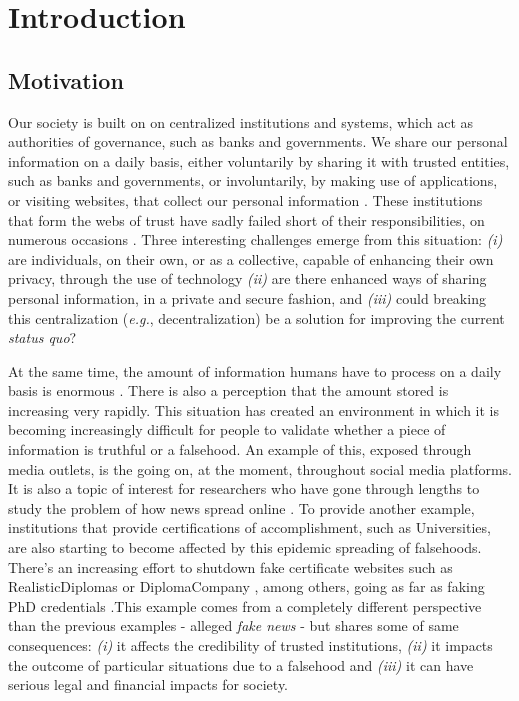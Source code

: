 \chapter{Introduction}
\label{chap:intro}

\section{Motivation}
\label{sec:intro-motivation}

Our society is built on on centralized institutions and systems, which act as authorities of governance, such as banks and governments. We share our personal information on a daily basis, either voluntarily by sharing it with trusted entities, such as banks and governments, or involuntarily, by making use of applications, or visiting websites, that collect our personal information \cite{debatin_facebook_2009, choi_embarrassing_2015, shilton_four_nodate}. These institutions that form the webs of trust have sadly failed short of their responsibilities, on numerous occasions \cite{gibbs_facebook_2014, ivashina_bank_2010, marthews_government_2017}. Three interesting challenges emerge from this situation: \emph{(i)} are individuals, on their own, or as a collective, capable of enhancing their own privacy, through the use of technology \emph{(ii)} are there enhanced ways of sharing personal information, in a private and secure fashion, and \emph{(iii)} could breaking this centralization (\textit{e.g.}, decentralization) be a solution for improving the current \textit{status quo}?

At the same time, the amount of information humans have to process on a daily basis is enormous \cite{hilbert_worlds_2011, lee_information_2016}. There is also a perception that the amount stored is increasing very rapidly. This situation has created an environment in which it is becoming increasingly difficult for people to validate whether a piece of information is truthful or a falsehood. An example of this, exposed through media outlets, is the  going on, at the moment, throughout social media platforms. It is also a topic of interest for researchers who have gone through lengths to study the problem of how news spread online \cite{vosoughi_spread_2018}. To provide another example, institutions that provide certifications of accomplishment, such as Universities, are also starting to become affected by this epidemic spreading of falsehoods. There’s an increasing effort to shutdown fake certificate websites \cite{camilla_telegraph} such as RealisticDiplomas \cite{RealisticDiplomas} or DiplomaCompany \cite{DiplomaCompany}, among others, going as far as faking PhD credentials \cite{doctoroff_tang_2010}.This example comes from a completely different perspective than the previous examples - alleged \textit{fake news} - but shares some of same consequences: \emph{(i)} it affects the credibility of trusted institutions, \emph{(ii)} it impacts the outcome of particular situations due to a falsehood and \emph{(iii)} it can have serious legal and financial impacts for society.

